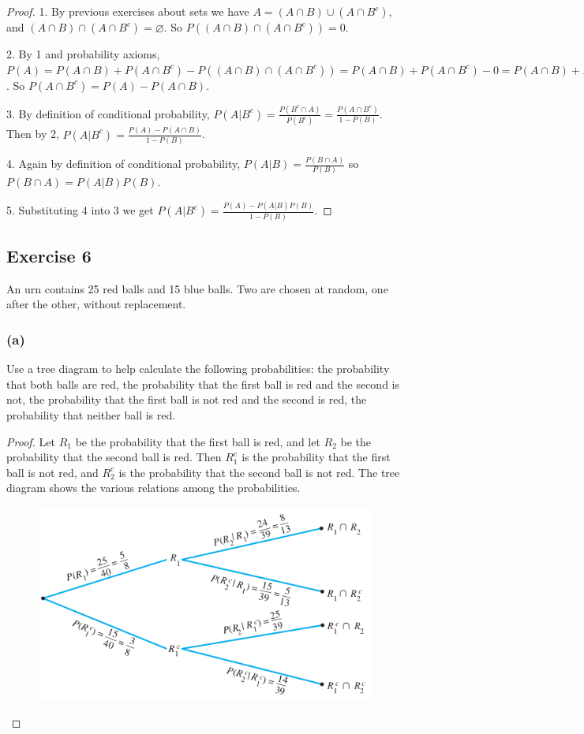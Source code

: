 \documentclass[14pt]{extarticle}
\newcommand{\es}{\varnothing}
\begin{document}
\begin{proof}
1. By previous exercises about sets we have \(A = (A \cap B) \cup (A \cap B^c)\), and \((A \cap B) \cap (A \cap B^c) = 
\es\). So \(P((A \cap B) \cap (A \cap B^c)) = 0\).

2. By 1 and probability axioms, \(P(A) = P(A \cap B) + P(A \cap B^c) - P((A \cap B) \cap (A \cap B^c)) = P(A \cap B) +
P(A \cap B^c) - 0 = P(A \cap B) + P(A \cap B^c)\). So \(P(A \cap B^c) = P(A) - P(A \cap B)\).

3. By definition of conditional probability, \(P(A | B^c) = \frac{P(B^c \cap A)}{P(B^c)} = \frac{P(A \cap B^c)}{1-P(B)}\).
Then by 2, \(P(A | B^c) = \frac{P(A) - P(A \cap B)}{1-P(B)}\).

4. Again by definition of conditional probability, \(P(A|B) = \frac{P(B \cap A)}{P(B)}\) so \(P(B \cap A) = P(A|B)P(B)\).

5. Substituting 4 into 3 we get \(P(A | B^c) = \frac{P(A) - P(A|B)P(B)}{1-P(B)}\).
\end{proof}

\subsection{Exercise 6}
An urn contains 25 red balls and 15 blue balls. Two are chosen at random, one after the other, without replacement.

\subsubsection{(a)}
Use a tree diagram to help calculate the following probabilities: the probability that both balls are red, the 
probability that the first ball is red and the second is not, the probability that the first ball is not red and the second 
is red, the probability that neither ball is red.

\begin{proof}
Let \(R_1\) be the probability that the first ball is red, and let \(R_2\) be the probability that the second ball is red. 
Then \(R_1^c\) is the probability that the first ball is not red, and \(R_2^c\) is the probability that the second ball is 
not red. The tree diagram shows the various relations among the probabilities.

\begin{figure}[ht!]
\centering
\includegraphics[scale=0.5]{../images/9.9.6.a.png}
\end{figure}
\end{proof}
\end{document}
